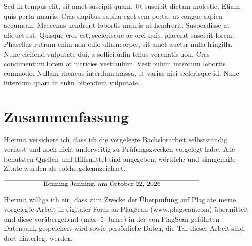 \documentclass[12pt,oneside,a4paper,parskip]{scrbook}
\def\BaAuthor{Henning Janning}
\begin{document}
Sed in tempus elit, sit amet suscipit quam. Ut suscipit dictum molestie. Etiam quis porta mauris. Cras dapibus sapien eget sem porta, ut congue sapien accumsan. Maecenas hendrerit lobortis mauris ut hendrerit. Suspendisse at aliquet est. Quisque eros est, scelerisque ac orci quis, placerat suscipit lorem. Phasellus rutrum enim non odio ullamcorper, sit amet auctor nulla fringilla. Nunc eleifend vulputate dui, a sollicitudin tellus venenatis non. Cras condimentum lorem at ultricies vestibulum. Vestibulum interdum lobortis commodo. Nullam rhoncus interdum massa, ut varius nisi scelerisque id. Nunc interdum quam in enim bibendum vulputate.

\chapter{Zusammenfassung}


\backmatter

\listoffigures
{}

\listoftables


\cleardoublepage
{}
{}
\printbibliography



Hiermit versichere ich, dass ich die vorgelegte Bachelorarbeit selbstständig verfasst und noch nicht anderweitig zu Prüfungszwecken vorgelegt habe. Alle benutzten Quellen und Hilfsmittel sind angegeben, wörtliche und sinngemäße Zitate wurden als solche gekennzeichnet.

\vspace{20pt}
\begin{flushright}
$\overline{~~~~~~~~~~~~~~~~~\mbox{\BaAuthor, am \today}~~~~~~~~~~~~~~~~~}$
\end{flushright}


Hiermit willige ich ein, dass zum Zwecke der Überprüfung auf Plagiate meine vorgelegte Arbeit in digitaler Form an PlagScan (www.plagscan.com) übermittelt und diese vorübergehend (max. 5~Jahre) in der von PlagScan geführten Datenbank gespeichert wird sowie persönliche Daten, die Teil dieser Arbeit sind, dort hinterlegt werden.
\end{document}
